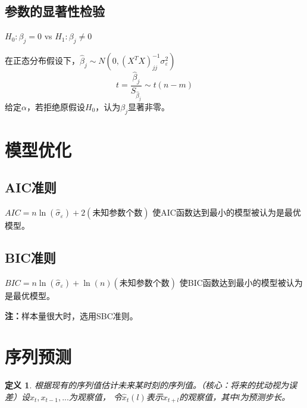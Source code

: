 \documentclass[12pt, a4paper, oneside]{ctexbook}
\newtheorem{definition}[theorem]{定义}
\begin{document}
\subsection{参数的显著性检验}
\begin{center}
    $H_0:\beta_j= 0$ vs
    $H_1:\beta_j \neq 0$
\end{center}
在正态分布假设下，$\hat{\beta}_j\sim N(0,(X^TX)_{jj}^{-1}\sigma_{\varepsilon}^2)$
\begin{equation*}
    t = \frac{\hat{\beta}_j}{S_{\hat{\beta}_j}} \sim t(n-m)
\end{equation*}
给定$\alpha$，若拒绝原假设$H_0$，认为$\beta_j$显著非零。

\section{模型优化}
\subsection{AIC准则}
$AIC = n\ln(\hat{\sigma}_{\varepsilon}) + 2(\text{未知参数个数})$
使AIC函数达到最小的模型被认为是最优模型。

\subsection{BIC准则}
$BIC = n\ln(\hat{\sigma}_{\varepsilon}) + \ln(n)(\text{未知参数个数})$
使BIC函数达到最小的模型被认为是最优模型。

\textbf{注：}样本量很大时，选用SBC准则。

\section{序列预测}\label{se4_7}
\begin{definition}
    根据现有的序列值估计未来某时刻的序列值。（核心：将来的扰动视为误差）设$x_t,x_{t-1},...$为观察值，
    令$\hat{x}_t(l)$表示$x_{t+l}$的观察值，其中$l$为预测步长。
\end{definition}
\end{document}
